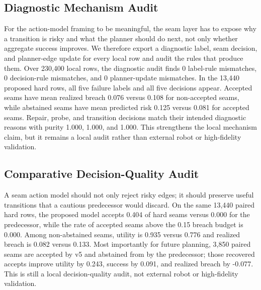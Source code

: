 \documentclass{article}
\begin{document}
\subsection{Diagnostic Mechanism Audit}
For the action-model framing to be meaningful, the seam layer has to expose why a transition is risky and what the planner should do next, not only whether aggregate success improves. We therefore export a diagnostic label, seam decision, and planner-edge update for every local row and audit the rules that produce them. Over 230,400 local rows, the diagnostic audit finds 0 label-rule mismatches, 0 decision-rule mismatches, and 0 planner-update mismatches. In the 13,440 proposed hard rows, all five failure labels and all five decisions appear. Accepted seams have mean realized breach 0.076 versus 0.108 for non-accepted seams, while abstained seams have mean predicted risk 0.125 versus 0.081 for accepted seams. Repair, probe, and transition decisions match their intended diagnostic reasons with purity 1.000, 1.000, and 1.000. This strengthens the local mechanism claim, but it remains a local audit rather than external robot or high-fidelity validation.
\begin{center}\small\resizebox{\linewidth}{!}{}\end{center}
\subsection{Comparative Decision-Quality Audit}
A seam action model should not only reject risky edges; it should preserve useful transitions that a cautious predecessor would discard. On the same 13,440 paired hard rows, the proposed model accepts 0.404 of hard seams versus 0.000 for the predecessor, while the rate of accepted seams above the 0.15 breach budget is 0.000. Among non-abstained seams, utility is 0.935 versus 0.776 and realized breach is 0.082 versus 0.133. Most importantly for future planning, 3,850 paired seams are accepted by v5 and abstained from by the predecessor; those recovered accepts improve utility by 0.243, success by 0.091, and realized breach by -0.077. This is still a local decision-quality audit, not external robot or high-fidelity validation.
\begin{center}\small\resizebox{\linewidth}{!}{}\end{center}
\end{document}
